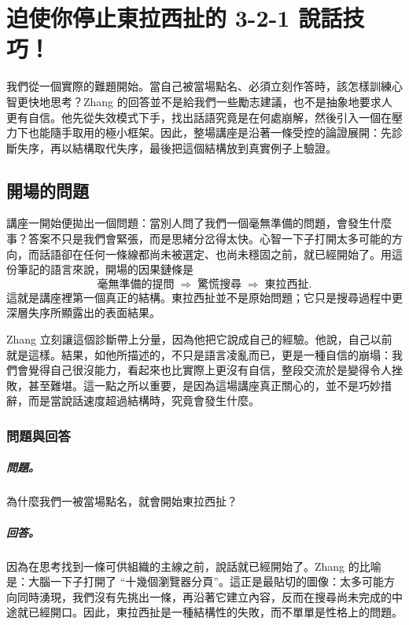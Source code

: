 \chapter{迫使你停止東拉西扯的 3-2-1 說話技巧！}

我們從一個實際的難題開始。當自己被當場點名、必須立刻作答時，該怎樣訓練心智更快地思考？Zhang 的回答並不是給我們一些勵志建議，也不是抽象地要求人更有自信。他先從失效模式下手，找出話語究竟是在何處崩解，然後引入一個在壓力下也能隨手取用的極小框架。因此，整場講座是沿著一條受控的論證展開：先診斷失序，再以結構取代失序，最後把這個結構放到真實例子上驗證。

\section{開場的問題}

講座一開始便拋出一個問題：當別人問了我們一個毫無準備的問題，會發生什麼事？答案不只是我們會緊張，而是思緒分岔得太快。心智一下子打開太多可能的方向，而話語卻在任何一條線都尚未被選定、也尚未穩固之前，就已經開始了。用這份筆記的語言來說，開場的因果鏈條是
\begin{equation}
\text{毫無準備的提問}
\;\Rightarrow\;
\text{驚慌搜尋}
\;\Rightarrow\;
\text{東拉西扯}.
\end{equation}
這就是講座裡第一個真正的結構。東拉西扯並不是原始問題；它只是搜尋過程中更深層失序所顯露出的表面結果。

Zhang 立刻讓這個診斷帶上分量，因為他把它說成自己的經驗。他說，自己以前就是這樣。結果，如他所描述的，不只是語言凌亂而已，更是一種自信的崩塌：我們會覺得自己很沒能力，看起來也比實際上更沒有自信，整段交流於是變得令人挫敗，甚至難堪。這一點之所以重要，是因為這場講座真正關心的，並不是巧妙措辭，而是當說話速度超過結構時，究竟會發生什麼。

\subsection{問題與回答}

\paragraph{問題。} 為什麼我們一被當場點名，就會開始東拉西扯？

\paragraph{回答。} 因為在思考找到一條可供組織的主線之前，說話就已經開始了。Zhang 的比喻是：大腦一下子打開了 ``十幾個瀏覽器分頁''。這正是最貼切的圖像：太多可能方向同時湧現，我們沒有先挑出一條，再沿著它建立內容，反而在搜尋尚未完成的中途就已經開口。因此，東拉西扯是一種結構性的失敗，而不單單是性格上的問題。

